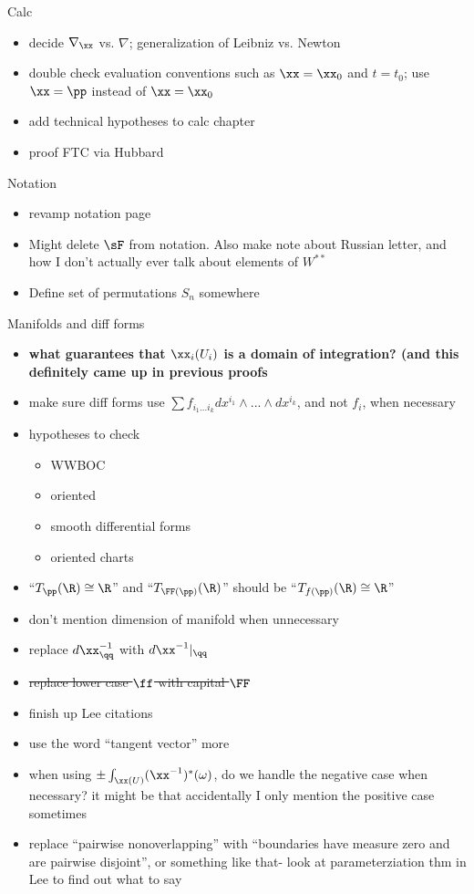 Calc
\begin{itemize}
    \item decide $\nabla_\xx$ vs. $\nabla$; generalization of Leibniz vs. Newton
    \item double check evaluation conventions such as $\xx = \xx_0$ and $t = t_0$; use $\xx = \pp$ instead of $\xx = \xx_0$
    \item add technical hypotheses to calc chapter
    \item proof FTC via Hubbard
\end{itemize}

Notation
\begin{itemize}
    \item revamp notation page
    \item Might delete $\sF$ from notation. Also make note about Russian letter, and how I don't actually ever talk about elements of $W^{**}$
    \item Define set of permutations $S_n$ somewhere
\end{itemize}

Manifolds and diff forms
\begin{itemize}
    \item \textbf{what guarantees that $\xx_i(U_i)$ is a domain of integration? (and this definitely came up in previous proofs}
    \item make sure diff forms use $\sum f_{i_1 ... i_k} dx^{i_1} \wedge ... \wedge dx^{i_k}$, and not $f_i$, when necessary
    \item hypotheses to check
    \begin{itemize}
        \item WWBOC
        \item oriented
        \item smooth differential forms
        \item oriented charts
    \end{itemize}
    \item ``$T_\pp(\R) \cong \R$'' and ``$T_{\FF(\pp)}(\R)$'' should be ``$T_{f(\pp)}(\R) \cong \R$''
    \item don't mention dimension of manifold when unnecessary
    \item replace $d\xx_\qq^{-1}$ with $d\xx^{-1}|_\qq$
    \item \sout{replace lower case $\ff$ with capital $\FF$}
    \item finish up Lee citations
    \item use the word ``tangent vector'' more
    \item when using $\pm \int_{\xx(U)} (\xx^{-1})^*(\omega)$, do we handle the negative case when necessary? it might be that accidentally I only mention the positive case sometimes
    \item replace ``pairwise nonoverlapping'' with ``boundaries have measure zero and are pairwise disjoint'', or something like that- look at parameterziation thm in Lee to find out what to say
\end{itemize}

